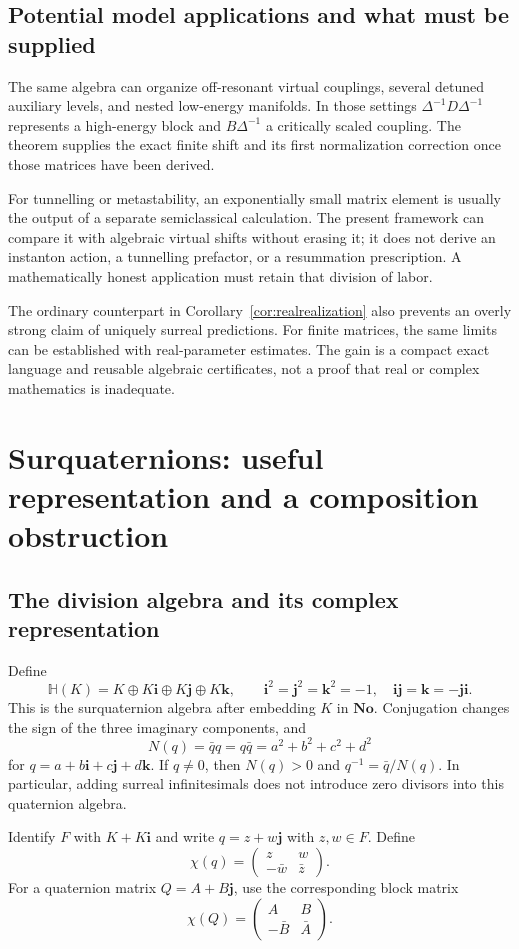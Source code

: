 \documentclass[11pt,oneside]{article}
\numberwithin{equation}{section}
\theoremstyle{plain}
\theoremstyle{definition}
\theoremstyle{remark}
\newcommand{\No}{\mathbf{No}}
\newcommand{\HH}{\mathbb H}
\begin{document}
\subsection{Potential model applications and what must be supplied}
The same algebra can organize off-resonant virtual couplings, several detuned auxiliary levels, and nested low-energy manifolds. In those settings $\Delta^{-1}D\Delta^{-1}$ represents a high-energy block and $B\Delta^{-1}$ a critically scaled coupling. The theorem supplies the exact finite shift and its first normalization correction once those matrices have been derived.

For tunnelling or metastability, an exponentially small matrix element is usually the output of a separate semiclassical calculation. The present framework can compare it with algebraic virtual shifts without erasing it; it does not derive an instanton action, a tunnelling prefactor, or a resummation prescription. A mathematically honest application must retain that division of labor.

The ordinary counterpart in Corollary~\ref{cor:realrealization} also prevents an overly strong claim of uniquely surreal predictions. For finite matrices, the same limits can be established with real-parameter estimates. The gain is a compact exact language and reusable algebraic certificates, not a proof that real or complex mathematics is inadequate.

\section{Surquaternions: useful representation and a composition obstruction}\label{sec:quaternions}

\subsection{The division algebra and its complex representation}
Define
\[
 \HH(K)=K\oplus K\mathbf i\oplus K\mathbf j\oplus K\mathbf k,
 \qquad \mathbf i^2=\mathbf j^2=\mathbf k^2=-1,
 \quad \mathbf i\mathbf j=\mathbf k=-\mathbf j\mathbf i.
\]
This is the surquaternion algebra after embedding $K$ in $\No$. Conjugation changes the sign of the three imaginary components, and
\[
 N(q)=\bar q q=q\bar q=a^2+b^2+c^2+d^2
\]
for $q=a+b\mathbf i+c\mathbf j+d\mathbf k$. If $q\ne0$, then $N(q)>0$ and $q^{-1}=\bar q/N(q)$. In particular, adding surreal infinitesimals does not introduce zero divisors into this quaternion algebra.

Identify $F$ with $K+K\mathbf i$ and write $q=z+w\mathbf j$ with $z,w\in F$. Define
\begin{equation}\label{eq:chi}
 \chi(q)=\begin{pmatrix}z&w\\-\bar w&\bar z\end{pmatrix}.
\end{equation}
For a quaternion matrix $Q=A+B\mathbf j$, use the corresponding block matrix
\[
 \chi(Q)=\begin{pmatrix}A&B\\-\bar B&\bar A\end{pmatrix}.
\]
\end{document}
